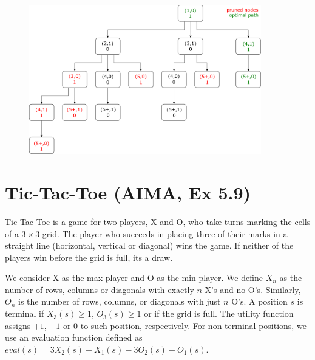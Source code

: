 \documentclass[11pt, a4paper]{article}
\begin{document}
\begin{enumerate}
    \begin{solution}
        \begin{figure}[H]
            \centering
            \includegraphics[width=0.9\textwidth]{figures/e2_21.pdf}
        \end{figure}
    \end{solution}
\end{enumerate}

\newpage

\section{Tic-Tac-Toe (AIMA, Ex 5.9)}

Tic-Tac-Toe is a game for two players, X and O, who take turns marking the cells of a $3 \times 3$ grid. The player who succeeds in placing three of their marks in a straight line (horizontal, vertical or diagonal) wins the game. If neither of the players win before the grid is full, its a draw.

We consider X as the max player and O as the min player. We define $X_n$ as the number of rows, columns or diagonals with exactly $n$ X's and no O's. Similarly, $O_n$ is the number of rows, columns, or diagonals with just $n$ O's. A position $s$ is terminal if $X_3(s) \geq 1$, $O_3(s) \geq 1$ or if the grid is full. The utility function assigns $+1$, $-1$ or $0$ to such position, respectively. For non-terminal positions, we use an evaluation function defined as $eval(s) = 3 X_2(s) + X_1(s) - 3 O_2(s) - O_1(s)$.
\end{document}
